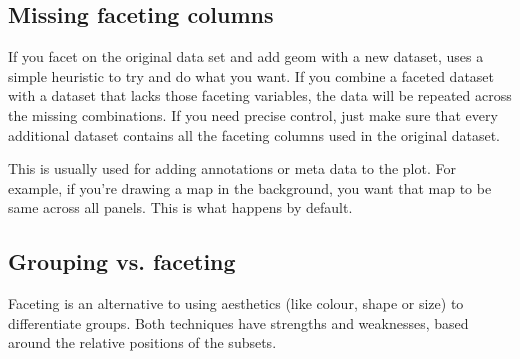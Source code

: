 % 
% 
% 


\subsection{Missing faceting columns}
\label{sub:missing_faceting_columns}

If you facet on the original data set and add geom with a new dataset, \ggplot uses a simple heuristic to try and do what you want.  If you combine a faceted dataset with a dataset that lacks those faceting variables, the data will be repeated across the missing combinations. If you need precise control, just make sure that every additional dataset contains all the faceting columns used in the original dataset.

This is usually used for adding annotations or meta data to the plot.  For example, if you're drawing a map in the background, you want that map to be same across all panels.  This is what happens by default.

% 
% 
% 


\subsection{Grouping vs. faceting}
\label{sub:group-vs-facet}

Faceting is an alternative to using aesthetics (like colour, shape or size) to differentiate groups. Both techniques have strengths and weaknesses, based around the relative positions of the subsets. 

